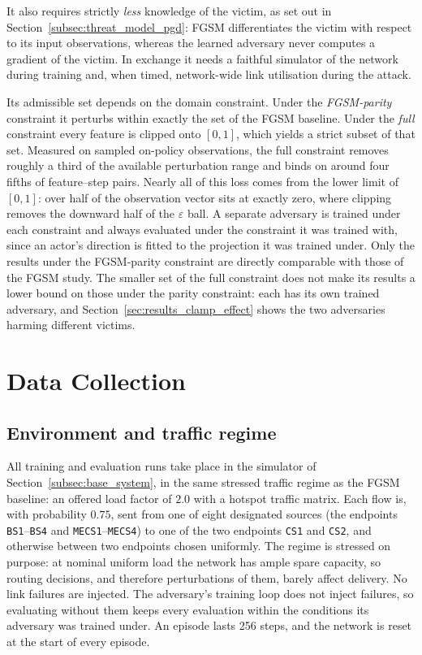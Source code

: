 It also requires strictly \emph{less} knowledge of the victim, as set out in
Section~\ref{subsec:threat_model_pgd}: FGSM differentiates the victim with respect to its
input observations, whereas the learned adversary never computes a gradient of the
victim. In exchange it needs a faithful simulator of the network during training and,
when timed, network-wide link utilisation during the attack.

Its admissible set depends on the domain constraint. Under the \emph{FGSM-parity}
constraint it perturbs within exactly the set of the FGSM baseline. Under the \emph{full}
constraint every feature is clipped onto $[0,1]$, which yields a strict subset of that
set. Measured on sampled on-policy observations, the full constraint removes roughly a
third of the available perturbation range and binds on around four fifths of
feature--step pairs. Nearly all of this loss comes from the lower limit of $[0,1]$: over
half of the observation vector sits at exactly zero, where clipping removes the downward
half of the $\varepsilon$ ball. A separate adversary is trained under each constraint and
always evaluated under the constraint it was trained with, since an actor's direction is
fitted to the projection it was trained under. Only the results under the FGSM-parity
constraint are directly comparable with those of the FGSM study. The smaller set of the
full constraint does not make its results a lower bound on those under the parity
constraint: each has its own trained adversary, and
Section~\ref{sec:results_clamp_effect} shows the two adversaries harming different
victims.

\section{Data Collection}
\label{subsec:eval_protocol}

\subsection{Environment and traffic regime}
\label{subsec:procedure_environment}

All training and evaluation runs take place in the simulator of
Section~\ref{subsec:base_system}, in the same stressed traffic regime as the FGSM
baseline: an offered load factor of $2.0$ with a hotspot traffic matrix. Each flow is,
with probability $0.75$, sent from one of eight designated sources (the endpoints
\texttt{BS1}--\texttt{BS4} and \texttt{MECS1}--\texttt{MECS4}) to one of the two
endpoints \texttt{CS1} and \texttt{CS2}, and otherwise between two endpoints chosen
uniformly. The regime is stressed on purpose: at nominal uniform load the network has
ample spare capacity, so routing decisions, and therefore perturbations of them, barely
affect delivery. No link failures are injected. The adversary's training loop does not
inject failures, so evaluating without them keeps every evaluation within the conditions
its adversary was trained under. An episode lasts 256 steps, and the network is reset at
the start of every episode.

